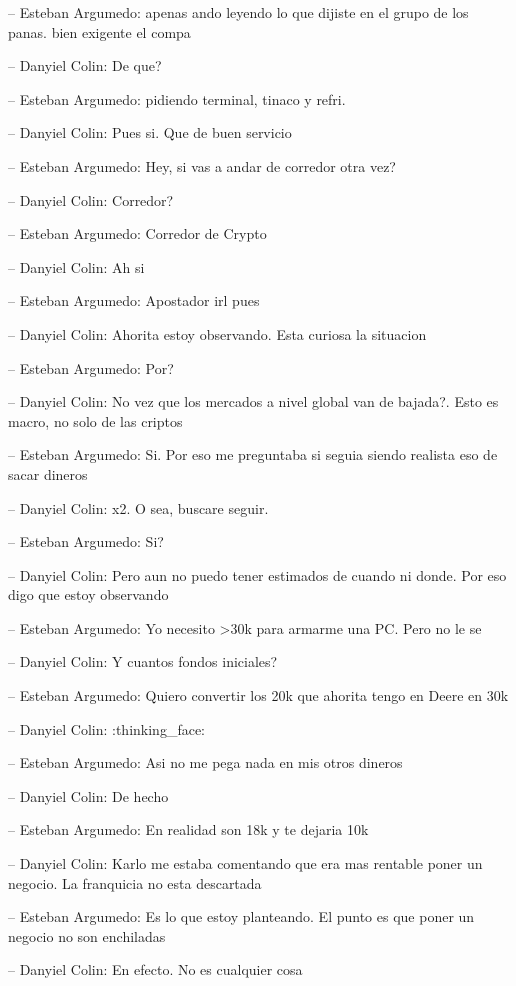 -- Esteban Argumedo: apenas ando leyendo lo que dijiste en el grupo de
los panas. bien exigente el compa

-- Danyiel Colin: De que?

-- Esteban Argumedo: pidiendo terminal, tinaco y refri.

-- Danyiel Colin: Pues si. Que de buen servicio

-- Esteban Argumedo: Hey, si vas a andar de corredor otra vez?

-- Danyiel Colin: Corredor?

-- Esteban Argumedo: Corredor de Crypto

-- Danyiel Colin: Ah si

-- Esteban Argumedo: Apostador irl pues

-- Danyiel Colin: Ahorita estoy observando. Esta curiosa la situacion

-- Esteban Argumedo: Por?

-- Danyiel Colin: No vez que los mercados a nivel global van de bajada?.
Esto es macro, no solo de las criptos

-- Esteban Argumedo: Si. Por eso me preguntaba si seguia siendo realista
eso de sacar dineros

-- Danyiel Colin: x2. O sea, buscare seguir.

-- Esteban Argumedo: Si?

-- Danyiel Colin: Pero aun no puedo tener estimados de cuando ni donde.
Por eso digo que estoy observando

-- Esteban Argumedo: Yo necesito \textgreater30k para armarme una PC.
Pero no le se

-- Danyiel Colin: Y cuantos fondos iniciales?

-- Esteban Argumedo: Quiero convertir los 20k que ahorita tengo en Deere
en 30k

-- Danyiel Colin: :thinking\_face:

-- Esteban Argumedo: Asi no me pega nada en mis otros dineros

-- Danyiel Colin: De hecho

-- Esteban Argumedo: En realidad son 18k y te dejaria 10k

-- Danyiel Colin: Karlo me estaba comentando que era mas rentable poner
un negocio. La franquicia no esta descartada

-- Esteban Argumedo: Es lo que estoy planteando. El punto es que poner
un negocio no son enchiladas

-- Danyiel Colin: En efecto. No es cualquier cosa

